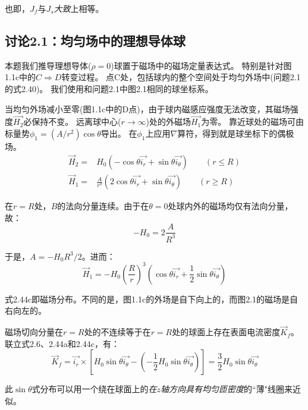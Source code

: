 也即，$J_f$与$J_s$\textit{大致}上相等。



\subsection{讨论2.1：均匀场中的理想导体球}
本题我们推导理想导体($\rho=0$)球置于磁场中的磁场定量表达式。
特别是针对图 1.1c中的$C\Rightarrow D$转变过程。
点C处，包括球内的整个空间处于均匀外场中(问题2.1的式2.40)。
我们使用和问题2.1中图2.1相同的球坐标系。

当均匀外场减小至零(图1.1c中的D点)，由于球内磁感应强度无法改变，其磁场强度$\vec{H_2}$必保持不变。
远离球中心($r\rightarrow \infty$)处的外磁场$\vec{H_1}$为零。
靠近球处的磁场可由标量势$\phi_1=(A/r^2)\cos\theta$导出。
在$\phi_1$上应用$\nabla$算符，得到就是球坐标下的偶极场。
\begin{subequations}
	\begin{align}
\vec{H}_2=&H_0 (-\cos\theta \vec{i_r}+\sin\theta \vec{i_\theta})  \qquad(r\le R) \\
\vec{H}_1 =&\frac{A}{r^3}(2\cos\theta \vec{i_r}+\sin\theta \vec{i_\theta})\qquad  (r\ge R)
	\end{align}
\end{subequations}

在$r=R$处，$B$的法向分量连续。由于在$\theta=0$处球内外的磁场均仅有法向分量，故：
\begin{equation*}
-H_0=2\frac{A}{R^3}
\end{equation*}

于是，$A=-H_0 R^3/2$。进而：
\begin{equation*}
\vec{H}_1=-H_0\left(\frac{R}{r}\right)^3 \left(\cos\theta \vec{i_r}+\frac{1}{2}\sin\theta \vec{i_\theta}\right) \tag{2.44c}
\end{equation*}


式2.44c即磁场分布。不同的是，图1.1c的外场是自下向上的，而图2.1的磁场是自右向左的。

磁场切向分量在$r=R$处的不连续等于在$r=R$处的球面上存在表面电流密度$\vec{K}_f$。
联立式2.6、2.44a和2.44c，有：
\begin{equation}
  \vec{K}_f=\vec{i_r}\times \left[H_0 \sin\theta \vec{i_\theta}-\left(-\frac{1}{2}H_0 \sin\theta \vec{i_\theta}\right)\right]=\frac{3}{2}H_0\sin\theta\vec{i_\theta}
\end{equation}

此$\sin\theta$式分布可以用一个绕在球面上的\textit{在$z$轴方向具有均匀匝密度}的``薄"线圈来近似。




